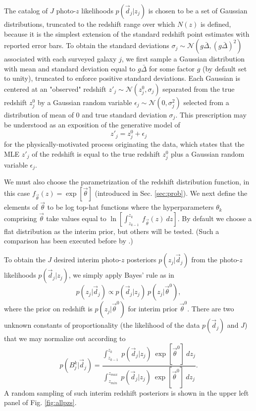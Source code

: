 \documentclass[preprint]{aastex}
\begin{document}
The catalog of $J$ photo-$z$ likelihoods $p(\vec{d}_{j}|z_{j})$ is chosen to be 
a set of Gaussian distributions, truncated to the redshift range over which 
$N(z)$ is defined, because it is the simplest extension of the standard 
redshift point estimates with reported error bars.  To obtain the standard 
deviations $\sigma_{j}\sim\mathcal{N}(g\bar{\Delta},(g\bar{\Delta})^{2})$ 
associated with each surveyed galaxy $j$, we first sample a Gaussian 
distribution with mean and standard deviation equal to $g\bar{\Delta}$ for some 
factor $g$ (by default set to unity), truncated to enforce positive standard 
deviations.  Each Gaussian is centered at an "observed" redshift 
$z'_{j}\sim\mathcal{N}(z^{0}_{j},\sigma_{j})$ separated from the true redshift 
$z^{0}_{j}$ by a Gaussian random variable 
$\epsilon_{j}\sim\mathcal{N}(0,\sigma^{2}_{j})$ selected from a distribution of 
mean of 0 and true standard deviation $\sigma_{j}$.   This prescription may be 
understood as an exposition of the generative model of 
\begin{equation}
\label{eq:genmod}
z'_{j} = z^{0}_{j}+\epsilon_{j}
\end{equation}
for the physically-motivated process originating the data, which states that 
the MLE $z'_{j}$ of the redshift is equal to the true redshift $z^{0}_{j}$ plus 
a Gaussian random variable $\epsilon_{j}$.

We must also choose the parametrization of the redshift distribution function, 
in this case $f_{\vec{\theta}}(z)=\exp[\vec{\theta}]$ (introduced in Sec. 
\ref{sec:prob}).  We next define the elements of $\vec{\theta}$ to be log 
top-hat functions where the hyperparameters $\theta_{k}$ comprising 
$\vec{\theta}$ take values equal to $\ln[\int_{z_{k-1}}^{z_{k}}\ 
f_{\vec{\theta}}(z)\ dz]$.  By default we choose a flat distribution as the 
interim prior, but others will be tested.  (Such a comparison has been executed 
before by \citet{Viironen2015}.)

To obtain the $J$ desired interim photo-$z$ posteriors $p(z_{j}|\vec{d}_{j})$ 
from the photo-$z$ likelihoods $p(\vec{d}_{j}|z_{j})$, we simply apply Bayes' 
rule as in 
\begin{equation}
\label{eq:likpost}
p(z_{j}|\vec{d}_{j}) \propto p(\vec{d}_{j}|z_{j})\ p(z_{j}|\vec{\theta}^{0}),
\end{equation}
where the prior on redshift is $p(z_{j}|\vec{\theta}^{0})$ for interim prior 
$\vec{\theta}^{0}$.  There are two unknown constants of proportionality (the 
likelihood of the data $p(\vec{d}_{j})$ and $J$) that we may normalize out 
according to 
\begin{equation}
\label{eq:norm}
p(B^{k}_{j}|\vec{d}_{j}) = \frac{\int_{z_{k-1}}^{z_{k}}\ p(\vec{d}_{j}|z_{j})\ 
\exp[\vec{\theta}^{0}]\ dz_{j}}{\int_{z_{min}}^{z_{max}}\ p(\vec{d}_{j}|z_{j})\ 
\exp[\vec{\theta}^{0}]\ dz_{j}}.
\end{equation}
A random sampling of such interim redshift posteriors is shown in the upper 
left panel of Fig. \ref{fig:allpzs}.
\end{document}
